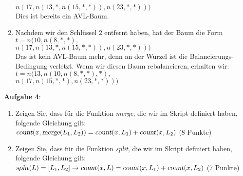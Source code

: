 \documentclass{article}
\begin{document}
\begin{enumerate}
      \hspace*{2.75cm} $
                n(17,
                     n(13, *, n(15, *, *)),
                     n(23, *, *)))$
      \\[0.2cm]
      Dies ist bereits ein AVL-Baum.
\item Nachdem wir den Schl\"ussel $2$ entfernt haben, hat der Baum die Form
      \\[0.2cm]
      \hspace*{1.3cm}
      $t = n(10, 
                n(8, *, *),$ \\
      \hspace*{2.75cm} $
                n(17,
                     n(13, *, n(15, *, *)),
                     n(23, *,*)))$
      \\[0.2cm]
      Das ist kein AVL-Baum mehr, denn an der Wurzel ist die Balancierungs-Bedingung verletzt.
      Wenn wir diesen Baum rebalancieren, erhalten wir:
      \\[0.2cm]
      \hspace*{1.3cm}
      $t = n(13, 
                n(10, n(8,*,*), *),$ \\
      \hspace*{2.75cm} $
                n(17,
                     n(15, *, *),
                     n(23, *,*)))$
      \\[0.2cm]
\end{enumerate}
\vspace{0.3cm}

\noindent
\textbf{Aufgabe 4}:
\begin{enumerate}
\item Zeigen Sie, dass f\"ur die Funktion \textsl{merge}, die wir im Skript definiert haben,
      folgende Gleichung gilt:
      \\
      \hspace*{1.3cm}
      $\textsl{count}(x, \textsl{merge}(L_1, L_2)) = \textsl{count}(x, L_1) + \textsl{count}(x, L_2)$
      \hspace*{\fill} (8 Punkte)
\item Zeigen Sie, dass f\"ur die Funktion \textsl{split}, die wir im Skript definiert haben,
      folgende Gleichung gilt:
      \\
      \hspace*{1.3cm}
      $\textsl{split}(L) = [L_1, L_2] \rightarrow \textsl{count}(x, L) = \textsl{count}(x, L_1) + \textsl{count}(x, L_2)$
      \hspace*{\fill} (7 Punkte)
\end{enumerate}
\end{document}
